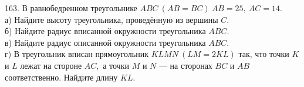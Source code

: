 163. В равнобедренном треугольнике $ABC\ (AB=BC)\ AB=25,\ AC=14.$\\
а) Найдите высоту треугольника, проведённую из вершины $C.$\\
б) Найдите радиус вписанной окружности треугольника $ABC.$\\
в) Найдите радиус описанной окружности треугольника $ABC.$\\
г) В треугольник вписан прямоугольник $KLMN\ (LM=2KL)$ так, что точки $K$ и $L$ лежат на стороне $AC,$ а точки $M$ и $N$ --- на сторонах $BC$ и $AB$ соответственно. Найдите длину $KL.$\\
